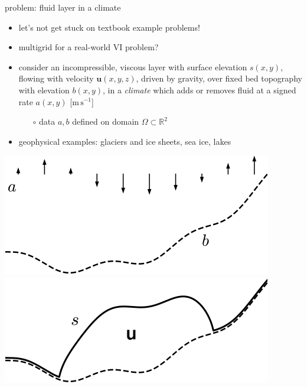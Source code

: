 \documentclass[svgnames,
               hyperref={colorlinks,citecolor=DeepPink4,linkcolor=FireBrick,urlcolor=Maroon},
               usepdftitle=false]  %
               {beamer}
\newcommand{\RR}{\mathbb{R}}
\newcommand{\bu}{\mathbf{u}}
\begin{document}
\begin{frame}{problem: fluid layer in a climate}

\begin{itemize}
\item let's not get stuck on textbook example problems!
\item multigrid for a real-world VI problem?
\item consider an incompressible, viscous layer with surface elevation $s(x,y)$, flowing with velocity $\bu(x,y,z)$, driven by gravity, over fixed bed topography with elevation $b(x,y)$, in a \emph{climate} which adds or removes fluid at a signed rate $a(x,y)$ [$\text{m}\,\text{s}^{-1}$]
    \begin{itemize}
    \item[$\circ$] data $a,b$ defined on domain $\Omega \subset \RR^2$
    \end{itemize}
\item geophysical examples: \alert{glaciers and ice sheets}, sea ice, lakes
\end{itemize}

\bigskip
\hfill \mbox{\includegraphics[height=0.25\textheight]{../talk-oxford/images/domain-data.png} \hspace{7mm} \includegraphics[height=0.25\textheight]{../talk-oxford/images/domain-velocity.png}}
\end{frame}
\end{document}
